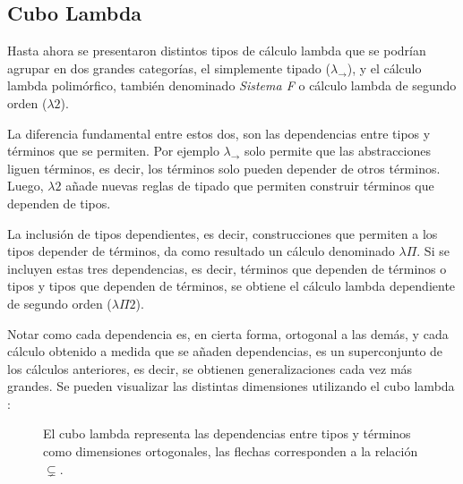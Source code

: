 \subsection{Cubo Lambda}
Hasta ahora se presentaron distintos tipos de cálculo lambda que se podrían agrupar en dos grandes categorías, el simplemente tipado ($\lambda_{\to}$), y el cálculo lambda polimórfico, también denominado \textit{Sistema F} o cálculo lambda de segundo orden ($\lambda 2$).

La diferencia fundamental entre estos dos, son las dependencias entre tipos y términos que se permiten.
Por ejemplo $\lambda_{\to}$ solo permite que las abstracciones liguen términos, es decir, los términos solo pueden depender de otros términos.
Luego, $\lambda 2$ añade nuevas reglas de tipado que permiten construir términos que dependen de tipos.

La inclusión de tipos dependientes, es decir, construcciones que permiten a los tipos depender de términos, da como resultado un cálculo denominado $\lambda\Pi$.
Si se incluyen estas tres dependencias, es decir, términos que dependen de términos o tipos y tipos que dependen de términos, se obtiene el cálculo lambda dependiente de segundo orden ($\lambda\Pi 2$).

Notar como cada dependencia es, en cierta forma, ortogonal a las demás, y cada cálculo obtenido a medida que se añaden dependencias, es un superconjunto de los cálculos anteriores, es decir, se obtienen generalizaciones cada vez más grandes.
Se pueden visualizar las distintas dimensiones utilizando el cubo lambda \cite{lambda_cube}:

\begin{figure}[H]
	\centering
	\caption{El cubo lambda representa las dependencias entre tipos y términos como dimensiones ortogonales, las flechas corresponden a la relación $\subsetneq$.}
\end{figure}

